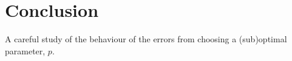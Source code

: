\chapter{Conclusion}

A careful study of the behaviour of the errors from choosing a (sub)optimal parameter, $p$.